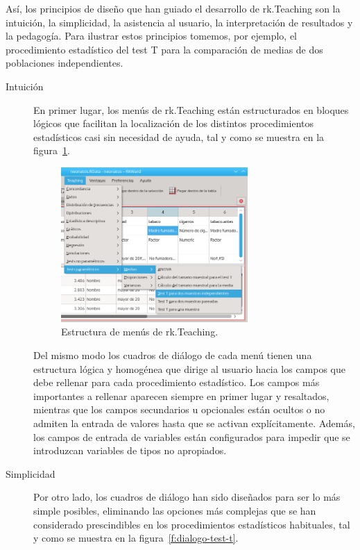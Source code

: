 \documentclass[a4paper,10pt,twoside]{article}
\newcommand{\rkteaching}{\textsf{rk.Teaching}}
\begin{document}
Así, los principios de diseño que han guiado el desarrollo de \rkteaching{} son la intuición, la simplicidad, la
asistencia al usuario, la interpretación de resultados y la pedagogía.  
Para ilustrar estos principios tomemos, por ejemplo, el procedimiento estadístico del test T para la comparación de
medias de dos poblaciones independientes.

\begin{description}
\item[Intuición] En primer lugar, los menús de \rkteaching{} están estructurados en bloques lógicos que facilitan la
localización de los distintos procedimientos estadísticos casi sin necesidad de ayuda, tal y como se muestra en la
figura~\ref{f:menu-test-t}.

\begin{figure}[htbp!]
\centering
\includegraphics[width=0.7\textwidth]{img/menu_test_t.png}
\caption{Estructura de menús de \rkteaching.}
\label{f:menu-test-t}
\end{figure}

Del mismo modo los cuadros de diálogo de cada menú tienen una estructura lógica y homogénea que dirige al usuario hacia
los campos que debe rellenar para cada procedimiento estadístico. 
Los campos más importantes a rellenar aparecen siempre en primer lugar y resaltados, mientras que los campos secundarios
u opcionales están ocultos o no admiten la entrada de valores hasta que se activan explícitamente. 
Además, los campos de entrada de variables están configurados para impedir que se introduzcan variables de tipos no
apropiados. 

\item[Simplicidad] Por otro lado, los cuadros de diálogo han sido diseñados para ser lo más simple posibles,
eliminando las opciones más complejas que se han considerado prescindibles en los procedimientos estadísticos
habituales, tal y como se muestra en la figura~\ref{f:dialogo-test-t}.


\end{description}
\end{document}

